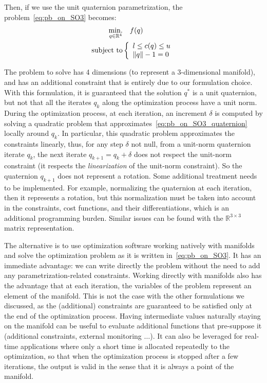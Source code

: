 Then, if we use the unit quaternion parametrization, the problem~\ref{eq:pb_on_SO3} becomes:
\begin{align}
\label{eq:pb_on_SO3_quaternion}
  \operatorname*{min.}_{q \in \mathbb{R}^4} & \quad f(q)\\
  \text{subject to}&
  \left\{\begin{array}{lr}
    {l} \leq c(q) \leq {u} \nonumber\\
    \|q\| - 1 = 0
  \end{array}\right.
\end{align}

The problem to solve has 4 dimensions (to represent a 3-dimensional manifold), and has an additional constraint that is entirely due to our formulation choice.
With this formulation, it is guaranteed that the solution $q^*$ is a unit quaternion, but not that all the iterates $q_k$ along the optimization process have a unit norm.
During the optimization process, at each iteration, an increment $\delta$ is computed by solving a quadratic problem that approximates~\ref{eq:pb_on_SO3_quaternion} locally around $q_k$.
In particular, this quadratic problem approximates the constraints linearly, thus, for any step $\delta$ not null, from a unit-norm quaternion iterate $q_k$, the next iterate $q_{k+1} = q_k + \delta$ does not respect the unit-norm constraint (it respects the \emph{linearization} of the unit-norm constraint).
So the quaternion $q_{k+1}$ does not represent a rotation.
Some additional treatment needs to be implemented.
For example, normalizing the quaternion at each iteration, then it represents a rotation, but this normalization must be taken into account in the constraints, cost functions, and their differentiations, which is an additional programming burden.
Similar issues can be found with the $\mathbb{R}^{3\times 3}$ matrix representation.

The alternative is to use optimization software working natively with manifolds~\cite{brossette:Humanoids:2015}\cite{absil:book:2008} and solve the optimization problem as it is written in~\ref{eq:pb_on_SO3}.
It has an immediate advantage: we can write directly the problem without the need to add any parametrization-related constraints.
Working directly with manifolds also has the advantage that at each iteration, the variables of the problem represent an element of the manifold.
This is not the case with the other formulations we discussed, as the (additional) constraints are guaranteed to be satisfied only at the end of the optimization process.
Having intermediate values naturally staying on the manifold can be useful to evaluate additional functions that pre-suppose it (additional constraints, external monitoring $\ldots$).
It can also be leveraged for real-time applications where only a short time is allocated repeatedly to the optimization, so that when the optimization process is stopped after a few iterations, the output is valid in the sense that it is always a point of the manifold.

